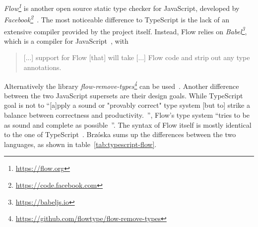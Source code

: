 \emph{Flow\footnote{\url{https://flow.org}}} is another open source static type checker for JavaScript, developed by \emph{Facebook\footnote{\url{https://code.facebook.com}}}~\cite{FacebookCode:Flow}. The most noticeable difference to TypeScript is the lack of an extensive compiler provided by the project itself. Instead, Flow relies on \emph{Babel\footnote{\url{https://babeljs.io}}}, which is a compiler for JavaScript~\cite{BabelWebsite}, with
\begin{quote}
  [...] support for Flow [that] will take [...] Flow code and strip out any type annotations.~\cite{FlowDocs:Install}
\end{quote}
Alternatively the library \emph{flow-remove-types\footnote{\url{https://github.com/flowtype/flow-remove-types}}} can be used~\cite{FlowDocs:Install}. Another difference between the two JavaScript supersets are their design goals. While TypeScript goal is not to ``[a]pply a sound or "provably correct" type system [but to] strike a balance between correctness and productivity.~\cite{TypeScriptWiki:DesignGoals}'', Flow's type system ``tries to be as sound and complete as possible~\cite{FlowDocs:TypesAndExpressions}''. The syntax of Flow itself is mostly identical to the one of TypeScript~\cite{FlowDocs:TypesAnnotations}. Brzóska sums up the differences between the two languages, as shown in table~\ref{tab:typescript-flow}.
